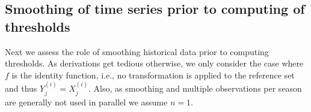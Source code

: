 \documentclass{article}
\begin{document}



\subsection{Smoothing of time series prior to computing of thresholds}
\label{subsec:smoothing}

Next we assess the role of smoothing historical data prior to computing thresholds. As derivations get tedious otherwise, we only consider the case where $f$ is the identity function, i.e., no transformation is applied to the reference set and thus $
Y^{(i)}_j = X^{(i)}_j$. Also, as smoothing and multiple observations per season are generally not used in parallel we assume $n = 1$.
\end{document}
